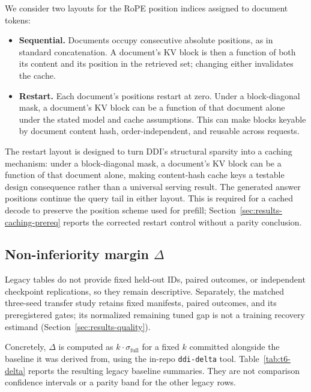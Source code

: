 We consider two layouts for the RoPE position indices assigned to document
tokens:
\begin{itemize}
    \item \textbf{Sequential.} Documents occupy consecutive absolute
          positions, as in standard concatenation. A document's KV block is
          then a function of both its content and its position in the
          retrieved set; changing either invalidates the cache.
    \item \textbf{Restart.} Each document's positions restart at zero.
           Under a block-diagonal mask, a document's KV block can be a
           function of that document alone under the stated model and cache
           assumptions. This can make blocks keyable by document content hash,
           order-independent, and reusable across requests.
\end{itemize}
The restart layout is designed to turn DDI's structural sparsity into a
caching mechanism: under a block-diagonal mask, a document's KV block
can be a function of that document alone, making content-hash cache keys a
testable design consequence rather than a universal serving result.
The generated answer positions continue the query tail in either layout.
This is required for a cached decode to preserve the position scheme used for
prefill; Section~\ref{sec:results-caching-prereq} reports the corrected
restart control without a parity conclusion.

\subsection{Non-inferiority margin \texorpdfstring{$\Delta$}{Delta}}
\label{sec:method-delta}

Legacy tables do not provide fixed held-out IDs, paired outcomes, or independent
checkpoint replications, so they remain descriptive. Separately, the matched
three-seed transfer study retains fixed manifests, paired outcomes, and its
preregistered gates; its normalized remaining tuned gap is not a training
recovery estimand (Section~\ref{sec:results-quality}).

Concretely, $\Delta$ is computed as $k\cdot \sigma_{\text{full}}$ for a
fixed $k$ committed alongside the baseline it was derived from, using the
in-repo \texttt{ddi-delta} tool. Table~\ref{tab:t6-delta} reports the
resulting legacy baseline summaries. They are not comparison confidence
intervals or a parity band for the other legacy rows.
